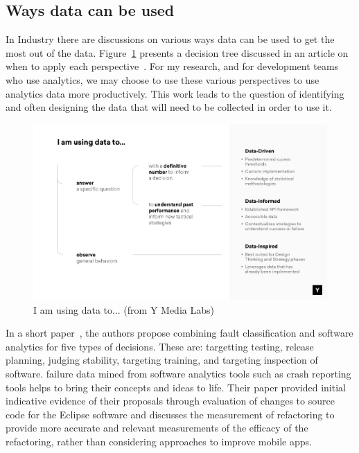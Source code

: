 \subsection{Ways data can be used}
In Industry there are discussions on various ways data can be used to get the most out of the data. Figure~\ref{fig:i_am_using_data_to} presents a decision tree discussed in an article on when to apply each perspective~\cite{amplitude_are_you_data_driven}. For my research, and for development teams who use analytics, we may choose to use these various perspectives to use analytics data more productively. This work leads to the question of identifying and often designing the data that will need to be collected in order to use it.

\begin{figure}[!htbp]
    \centering
    \includegraphics[width=15cm]{images/data-informed-graphic-ymedia-labs.png}
    \caption{I am using data to... (from Y Media Labs)~\cite{amplitude_are_you_data_driven}}
    \label{fig:i_am_using_data_to}
\end{figure}


In a short paper~\citep{kidwell2015_toward_fault_taxonomy_application_of_software_analytics}, the authors propose combining fault classification and software analytics for five types of decisions. These are: targetting testing, release planning, judging stability, targeting training, and targeting inspection of software. failure data mined from software analytics tools such as crash reporting tools helps to bring their concepts and ideas to life. Their paper provided initial indicative evidence of their proposals through evaluation of changes to source code for the Eclipse software and discusses the measurement of refactoring to provide more accurate and relevant measurements of the efficacy of the refactoring, rather than considering approaches to improve mobile apps.

